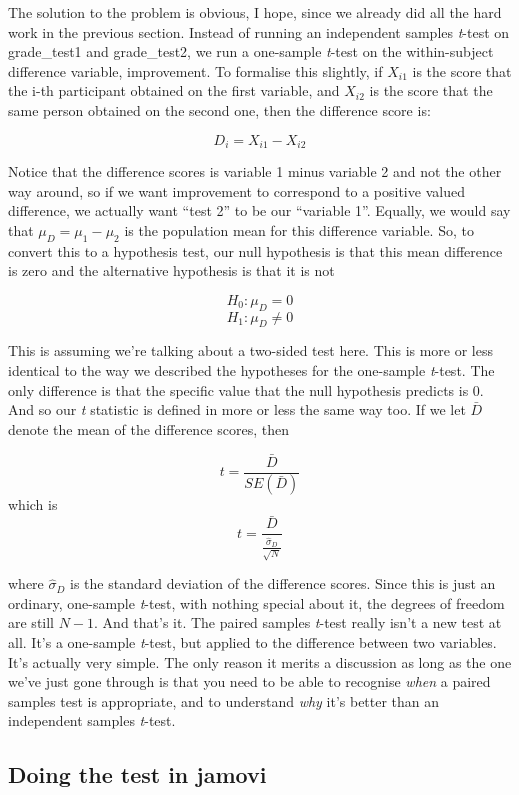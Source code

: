 \documentclass[
  a4paper,
]{book}
\begin{document}
The solution to the problem is obvious, I hope, since we already did all
the hard work in the previous section. Instead of running an independent
samples \emph{t}-test on grade\_test1 and grade\_test2, we run a
one-sample \emph{t}-test on the within-subject difference variable,
improvement. To formalise this slightly, if \(X_{i1}\) is the score that
the i-th participant obtained on the first variable, and \(X_{i2}\) is
the score that the same person obtained on the second one, then the
difference score is:

\[D_i=X_{i1}-X_{i2}\]

Notice that the difference scores is variable 1 minus variable 2 and not
the other way around, so if we want improvement to correspond to a
positive valued difference, we actually want ``test 2'' to be our
``variable 1''. Equally, we would say that \(\mu_D = \mu_1 - \mu_2\) is
the population mean for this difference variable. So, to convert this to
a hypothesis test, our null hypothesis is that this mean difference is
zero and the alternative hypothesis is that it is not

\[H_0:\mu_D=0\] \[H_1:\mu_D \neq 0\]

This is assuming we're talking about a two-sided test here. This is more
or less identical to the way we described the hypotheses for the
one-sample \emph{t}-test. The only difference is that the specific value
that the null hypothesis predicts is 0. And so our \emph{t} statistic is
defined in more or less the same way too. If we let \(\bar{D}\) denote
the mean of the difference scores, then

\[t=\frac{\bar{D}}{SE(\bar{D})}\] which is
\[t=\frac{\bar{D}}{\frac{\hat{\sigma}_D}{\sqrt{N}}}\]

where \(\hat{\sigma}_D\) is the standard deviation of the difference
scores. Since this is just an ordinary, one-sample \emph{t}-test, with
nothing special about it, the degrees of freedom are still \(N - 1\).
And that's it. The paired samples \emph{t}-test really isn't a new test
at all. It's a one-sample \emph{t}-test, but applied to the difference
between two variables. It's actually very simple. The only reason it
merits a discussion as long as the one we've just gone through is that
you need to be able to recognise \emph{when} a paired samples test is
appropriate, and to understand \emph{why} it's better than an
independent samples \emph{t}-test.

\hypertarget{doing-the-test-in-jamovi-4}{%
\subsection{Doing the test in jamovi}\label{doing-the-test-in-jamovi-4}}
\end{document}
